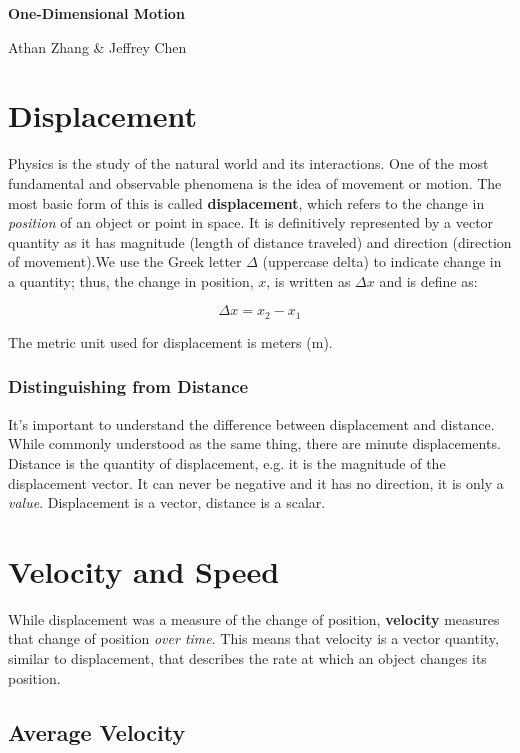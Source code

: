 \documentclass[11pt]{article}
\begin{document}
\textbf{\Huge One-Dimensional Motion}

Athan Zhang \& Jeffrey Chen

\section{Displacement}

Physics is the study of the natural world and its interactions. One of the most fundamental and observable phenomena is the idea of movement or motion. The most basic form of this is called \textbf{displacement}, which refers to the change in \textit{position} of an object or point in space. It is definitively represented by a vector quantity as it has magnitude (length of distance traveled) and direction (direction of movement).\footnotemark[1] We use the Greek letter $\Delta$ (uppercase delta) to indicate change in a quantity; thus, the change in position, $x$, is written as $\Delta x$ and is define as:

\begin{equation*}
    \Delta x = x_{2} - x_{1}
\end{equation*}

The metric unit used for displacement is meters (m).

\subsubsection*{Distinguishing from Distance}

It's important to understand the difference between displacement and distance. While commonly understood as the same thing, there are minute displacements. Distance is the quantity of displacement, e.g. it is the magnitude of the displacement vector. It can never be negative and it has no direction, it is only a \textit{value}. Displacement is a vector, distance is a scalar.

\section{Velocity and Speed}

While displacement was a measure of the change of position, \textbf{velocity} measures that change of position \textit{over time}. This means that velocity is a vector  quantity, similar to displacement, that describes the rate at which an object changes its position.\footnotemark[1]

\subsection{Average Velocity}
\end{document}
